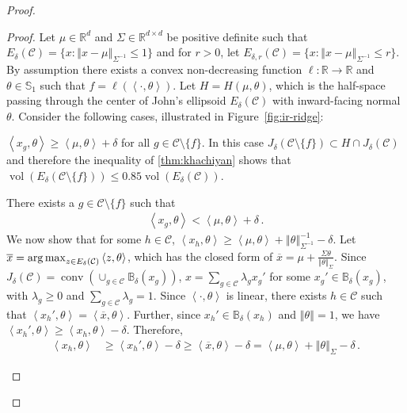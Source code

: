\documentclass[letter, 12pt]{report}
\newcommand{\R}{\mathbb R}
\newcommand{\argmax}{\operatornamewithlimits{arg\,max}}
\newcommand{\ip}[1]{\left \langle #1 \right \rangle}
\newcommand{\sphere}{\mathbb{S}}
\newcommand{\ball}{\mathbb{B}}
\newcommand{\norm}[1]{\left \Vert  #1 \right \Vert}
\newcommand{\cC}{\mathcal C}
\newcommand{\vol}{\operatorname{vol}}
\newcommand{\conv}{\operatorname{conv}}
\newcommand{\1}{\mathbf{1}}
\theoremstyle{plain}
\theoremstyle{definition}
\theoremstyle{remark}
\begin{document}
\begin{proof}
    \begin{proof}
        Let $\mu \in \R^d$ and $\Sigma \in \R^{d \times d}$ be positive definite such that $E_{\delta}(\cC) = \{x : \norm{x - \mu}_{\Sigma^{-1}} \leq 1 \}$ and for $r > 0$,
        let $E_{\delta,r}(\cC) = \{x : \norm{x - \mu}_{\Sigma^{-1}} \leq r\}$.
        By assumption there exists a convex non-decreasing function $\ell:\R\to\R$ and $\theta \in \sphere_1$ such that $f = \ell(\ip{\cdot, \theta})$.
        Let $H = H(\mu, \theta)$, which is the half-space passing through the center of John's ellipsoid $E_{\delta}(\cC)$ with inward-facing normal $\theta$.
        Consider the following cases, illustrated in Figure~\ref{fig:ir-ridge}:
        \begin{enumcases}
            \item \label{lem:ir-ridge:c1} $\ip{x_g, \theta} \geq \ip{\mu, \theta} + \delta$ for all $g \in \cC \setminus \{f\}$.
            In this case $J_\delta(\cC \setminus \{f\}) \subset H \cap J_\delta(\cC)$ and therefore
            the inequality of \cref{thm:khachiyan} shows that $\vol(E_{\delta}(\cC \setminus \{f\})) \leq 0.85 \vol(E_{\delta}(\cC))$.
            \item \label{lem:ir-ridge:c2} There exists a $g \in \cC \setminus \{f\}$ such that
            \begin{align}
                \ip{x_g, \theta} < \ip{\mu, \theta} + \delta\,.
                \label{eq:ts-ir-ridge-g}
            \end{align}
            We now show that for some $h \in \cC$, $\ip{x_h, \theta} \geq \ip{\mu, \theta} + \norm{\theta}_{\Sigma^{-1}}^{-1} - \delta$.
            Let $\overline{x} = \argmax_{z \in E_\delta(\cC)} \ip{z, \theta}$,
            which has the closed form of $\overline{x} = \mu + \tfrac{\Sigma \theta}{\norm{\theta}_\Sigma}$.
            Since $J_\delta(\cC) = \conv(\cup_{g \in \cC} \ball_\delta(x_g))$,
            $x = \sum_{g \in \cC} \lambda_g x_g'$ for some $x_g' \in \ball_\delta(x_g)$,
            with $\lambda_g \geq 0$ and $\sum_{g \in \cC} \lambda_g = 1$.
            Since $\ip{\cdot, \theta}$ is linear, there exists $h \in \cC$ such that $\ip{x_h', \theta} = \ip{\overline{x}, \theta}$.
            Further, since $x_h' \in \ball_\delta(x_h)$ and $\norm{\theta}=1$, we have $\ip{x_h', \theta} \geq \ip{x_h, \theta} - \delta$.
            Therefore,
            \begin{align}
                \ip{x_h, \theta} & \geq \ip{x_h', \theta} - \delta \geq \ip{\overline{x}, \theta} - \delta = \ip{\mu, \theta} + \norm{\theta}_{\Sigma} - \delta \,.
                \label{eq:ts-ir-ridge-h}
            \end{align}


\end{enumcases}
\end{proof}
\end{proof}
\end{document}

